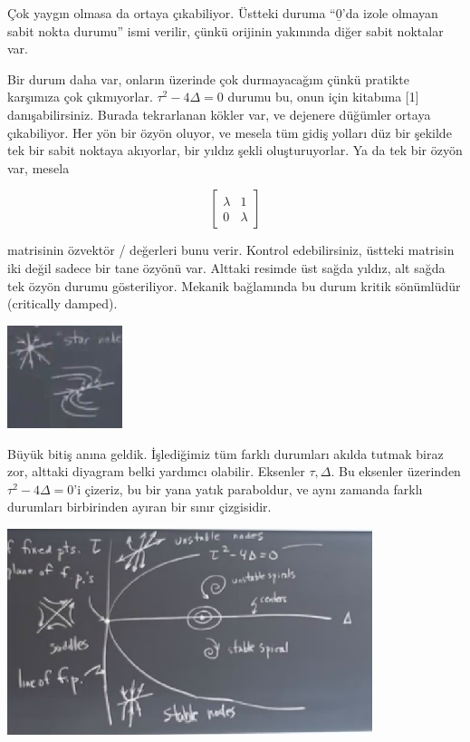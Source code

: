 \documentclass[12pt,fleqn]{article}\usepackage{../../common}
\begin{document}
Çok yaygın olmasa da ortaya çıkabiliyor. Üstteki duruma ``$\underline{0}$'da izole
olmayan sabit nokta durumu'' ismi verilir, çünkü orijinin yakınında diğer sabit
noktalar var.

Bir durum daha var, onların üzerinde çok durmayacağım çünkü pratikte karşımıza
çok çıkmıyorlar. $\tau^2 - 4\Delta = 0$ durumu bu, onun için kitabıma [1]
danışabilirsiniz. Burada tekrarlanan kökler var, ve dejenere düğümler ortaya
çıkabiliyor. Her yön bir özyön oluyor, ve mesela tüm gidiş yolları düz bir
şekilde tek bir sabit noktaya akıyorlar, bir yıldız şekli oluşturuyorlar. Ya da
tek bir özyön var, mesela

$$ \left[\begin{array}{rr}
\lambda & 1 \\ 0 & \lambda
\end{array}\right] $$

matrisinin özvektör / değerleri bunu verir. Kontrol edebilirsiniz, üstteki
matrisin iki değil sadece bir tane özyönü var. Alttaki resimde üst sağda yıldız,
alt sağda tek özyön durumu gösteriliyor. Mekanik bağlamında bu durum kritik
sönümlüdür (critically damped). 

\includegraphics[height=3cm]{05_21.png}

Büyük bitiş anına geldik. İşlediğimiz tüm farklı durumları akılda tutmak biraz
zor, alttaki diyagram belki yardımcı olabilir. Eksenler $\tau,\Delta$. Bu
eksenler üzerinden $\tau^2 - 4\Delta = 0$'i çizeriz, bu bir yana yatık
paraboldur, ve aynı zamanda farklı durumları birbirinden ayıran bir sınır
çizgisidir.

\includegraphics[height=6cm]{05_20.png}
\end{document}
